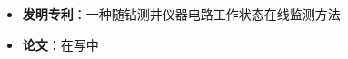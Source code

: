 \begin{itemize}
    \item \textbf{发明专利}：一种随钻测井仪器电路工作状态在线监测方法
    \item \textbf{论文}：在写中
\end{itemize}